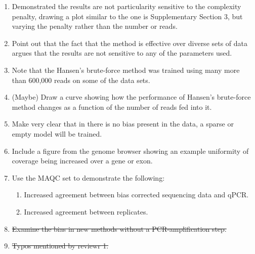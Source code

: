 \documentclass{article}
\begin{document}

\begin{enumerate}

\item Demonstrated the results are not particularity sensitive to the
complexity penalty, drawing a plot similar to the one is Supplementary Section
3, but varying the penalty rather than the number or reads.

\item Point out that the fact that the method is effective over diverse sets of
data argues that the results are not sensitive to any of the parameters used.

\item Note that the Hansen's brute-force method was trained using many more than
600,000 reads on some of the data sets.

\item (Maybe) Draw a curve showing how the performance of Hansen's brute-force
method changes as a function of the number of reads fed into it.

\item Make very clear that in there is no bias present in the data, a sparse or
empty model will be trained.

\item Include a figure from the genome browser showing an example uniformity of
coverage being increased over a gene or exon.

\item Use the MAQC set to demonstrate the following:
\begin{enumerate}
\item Increased agreement between bias corrected sequencing data and qPCR.
\item Increased agreement between replicates.
\end{enumerate}

\item \sout{Examine the bias in new methods without a PCR-amplification step.}

\item \sout{Typos mentioned by reviewr 1.}


\end{enumerate}
\end{document}
